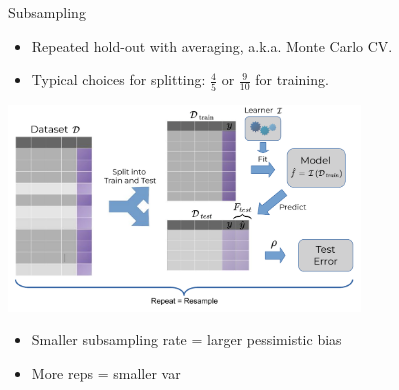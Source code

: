 \documentclass[11pt,compress,t,notes=noshow, xcolor=table]{beamer}
\begin{document}
\begin{vbframe}{Subsampling}

\begin{itemize}
  \item Repeated hold-out with averaging, a.k.a. Monte Carlo CV.
  \item Typical choices for splitting: $\frac{4}{5}$ or $\frac{9}{10}$ for 
  training.
\end{itemize}
\begin{center}
\includegraphics[width=0.7\textwidth]{figure_man/resampling_error.pdf}
\end{center}
\begin{itemize}
  \item Smaller subsampling rate = larger pessimistic bias
  \item More reps = smaller var
\end{itemize}

\end{vbframe}

\end{document}

